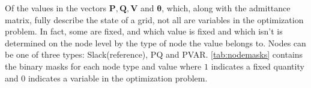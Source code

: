 Of the values in the vectors $\boldsymbol{P}, \boldsymbol{Q}, \boldsymbol{V}$ and $\boldsymbol{\theta}$,
which, along with the admittance matrix, fully describe the state of a grid, not all are variables in the optimization problem.
In fact, some are fixed, and which value is fixed and which isn't is determined on the node level by the type of node the value belongs to.
Nodes can be one of three types: Slack(reference), PQ and PVAR.
\ref{tab:nodemasks} contains the binary masks for each node type and value where $1$ indicates a fixed quantity and $0$
indicates a variable in the optimization problem.